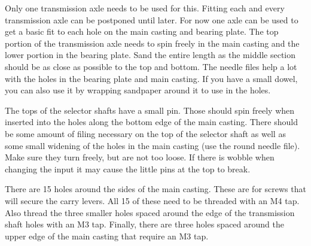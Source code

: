 \documentclass[openany]{book}
\begin{document}
Only one transmission axle needs to be used for this. Fitting each and every transmission axle can be postponed until later. For now one axle can be used to get a basic fit to each hole on the main casting and bearing plate. The top portion of the transmission axle needs to spin freely in the main casting and the lower portion in the bearing plate. Sand the entire length as the middle section should be as close as possible to the top and bottom. The needle files help a lot with the holes in the bearing plate and main casting. If you have a small dowel, you can also use it by wrapping sandpaper around it to use in the holes.

The tops of the selector shafts have a small pin. Those should spin freely when inserted into the holes along the bottom edge of the main casting. There should be some amount of filing necessary on the top of the selector shaft as well as some small widening of the holes in the main casting (use the round needle file). Make sure they turn freely, but are not too loose. If there is wobble when changing the input it may cause the little pins at the top to break.

There are 15 holes around the sides of the main casting. These are for screws that will secure the carry levers. All 15 of these need to be threaded with an M4 tap. Also thread the three smaller holes spaced around the edge of the transmission shaft holes with an M3 tap. Finally, there are three holes spaced around the upper edge of the main casting that require an M3 tap.
\end{document}
